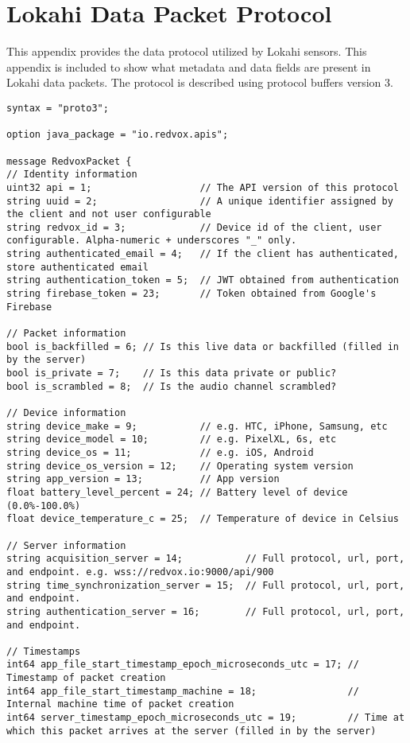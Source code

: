 \chapter{Lokahi Data Packet Protocol}
\label{lokahi-data-packet-protocol}

This appendix provides the data protocol utilized by Lokahi sensors. This appendix is included to show what metadata and data fields are present in Lokahi data packets. The protocol is described using protocol buffers version 3.

\begin{lstlisting}
syntax = "proto3";

option java_package = "io.redvox.apis";

message RedvoxPacket {
// Identity information
uint32 api = 1;                   // The API version of this protocol
string uuid = 2;                  // A unique identifier assigned by the client and not user configurable
string redvox_id = 3;             // Device id of the client, user configurable. Alpha-numeric + underscores "_" only.
string authenticated_email = 4;   // If the client has authenticated, store authenticated email
string authentication_token = 5;  // JWT obtained from authentication
string firebase_token = 23;       // Token obtained from Google's Firebase

// Packet information
bool is_backfilled = 6; // Is this live data or backfilled (filled in by the server)
bool is_private = 7;    // Is this data private or public?
bool is_scrambled = 8;  // Is the audio channel scrambled?

// Device information
string device_make = 9;           // e.g. HTC, iPhone, Samsung, etc
string device_model = 10;         // e.g. PixelXL, 6s, etc
string device_os = 11;            // e.g. iOS, Android
string device_os_version = 12;    // Operating system version
string app_version = 13;          // App version
float battery_level_percent = 24; // Battery level of device (0.0%-100.0%)
float device_temperature_c = 25;  // Temperature of device in Celsius

// Server information
string acquisition_server = 14;           // Full protocol, url, port, and endpoint. e.g. wss://redvox.io:9000/api/900
string time_synchronization_server = 15;  // Full protocol, url, port, and endpoint.
string authentication_server = 16;        // Full protocol, url, port, and endpoint.

// Timestamps
int64 app_file_start_timestamp_epoch_microseconds_utc = 17; // Timestamp of packet creation
int64 app_file_start_timestamp_machine = 18;                // Internal machine time of packet creation
int64 server_timestamp_epoch_microseconds_utc = 19;         // Time at which this packet arrives at the server (filled in by the server)


\end{lstlisting}
